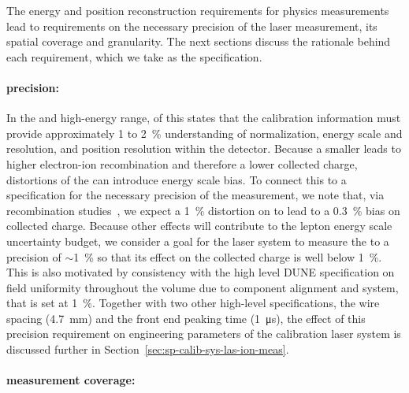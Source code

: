 

The energy and position reconstruction requirements for physics measurements lead to requirements on the necessary precision of the laser %
\efield measurement, its spatial coverage and granularity. The next sections discuss the rationale behind each requirement, which we take as the  specification.

\paragraph{\efield precision:}


In the  and high-energy range, \physchlbl of this 
states that the calibration information must provide approximately \num{1} to \SI{2}{\%} understanding of normalization, energy scale and resolution, and position resolution within the detector.
Because a smaller \efield leads to higher electron-ion recombination and therefore a lower collected charge, distortions of the \efield can introduce
energy scale bias. To connect this
to a specification for the necessary precision of the \efield measurement, we note that, via recombination studies~\cite{bib:mooney2018}, we expect a \SI{1}{\%} distortion on \efield to lead to a \SI{0.3}{\%} bias on collected charge.
Because other effects will contribute to the lepton energy scale uncertainty budget, we consider a goal for the 
laser system to measure the \efield to a precision of $\sim$\SI{1}{\%} so that its effect on the collected charge is well below \SI{1}{\%}.
This is also motivated by consistency with the high level DUNE specification on field uniformity throughout the volume due to component alignment and  system, that 
is set at \SI{1}{\%}.
Together with two other high-level  specifications, the  wire spacing (\SI{4.7}{\mm}) and the front end peaking time (\SI{1}{\micro\s}), the effect of this \efield precision requirement on engineering parameters of the calibration laser system is discussed further %
in Section~\ref{sec:sp-calib-sys-las-ion-meas}.

\paragraph{\efield measurement coverage:}

